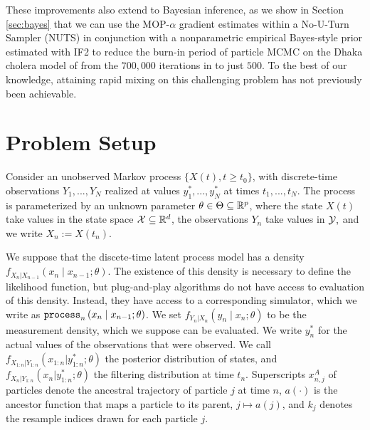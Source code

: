 \documentclass[9pt,twocolumn,pnasresearcharticle]{pnas-new}
\begin{document}
These improvements also extend to Bayesian inference, as we show in Section \ref{sec:bayes} that we can use the MOP-$\alpha$ gradient estimates within a No-U-Turn Sampler (NUTS) \cite{homan14} in conjunction with a nonparametric empirical Bayes-style prior estimated with IF2 to reduce the burn-in period of particle MCMC \cite{andrieu10} on the Dhaka cholera model of \cite{king08} from the $700,000$ iterations in \cite{fasiolo16} to just $500$. To the best of our knowledge, attaining rapid mixing on this challenging problem has not previously been achievable. 

\section{Problem Setup}

Consider an unobserved Markov process $\{X(t),t  \geq t_0\}$, with discrete-time observations $Y_1,...,Y_N$ realized at values $y_1^*,...,y_N^*$ at times $t_1,..., t_N$.
The process is parameterized by an unknown parameter $\theta \in \Theta \subseteq \mathbb{R}^p$, where the state $X(t)$ take values in the state space ${\mathcal{X}} \subseteq \mathbb{R}^d$, the observations $Y_n$ take values in ${\mathcal{Y}},$ and we write $X_n := X(t_n)$. 


We suppose that the discete-time latent process model has a density $f_{X_n|X_{n-1}}\left(x_{n} \mid x_{n-1}; \theta\right)$.
The existence of this density is necessary to define the likelihood function, but plug-and-play algorithms do not have access to evaluation of this density.
Instead, they have access to a corresponding simulator, which we write as $\texttt{process}_n\left(x_n\mid x_{n-1}; \theta\right)$.
We set $f_{Y_n|X_n}\left(y_n \mid x_n; \theta\right)$ to be the measurement density, which we suppose can be evaluated. We write $y_n^*$ for the actual values of the observations that were observed.
We call $f_{X_{1:n}|Y_{1:n}}(x_{1:n}|y_{1:n}^*; \theta)$ the posterior distribution of states, and $f_{X_{n}|Y_{1:n}}(x_n|y_{1:n}^*; \theta)$ the filtering distribution at time $t_n$.
Superscripts $x_{n,j}^A$ of particles denote the ancestral trajectory of particle $j$ at time $n$, $a(\cdot)$ is the ancestor function that maps a particle to its parent, $j \mapsto a(j)$, and $k_j$
denotes the resample indices drawn for each particle $j$. 
\end{document}
